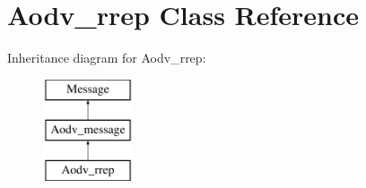 \hypertarget{class_aodv__rrep}{}\section{Aodv\+\_\+rrep Class Reference}
\label{class_aodv__rrep}
Inheritance diagram for Aodv\+\_\+rrep\+:\begin{figure}[H]
\begin{center}
\leavevmode
\includegraphics[height=3.000000cm]{class_aodv__rrep}
\end{center}
\end{figure}
